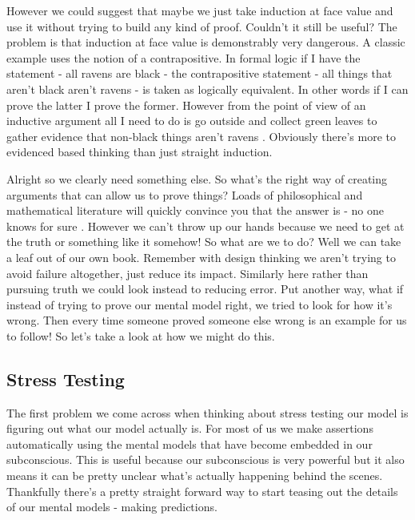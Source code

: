 \documentclass[11pt,a5paper]{book}
\begin{document}
However we could suggest that maybe we just take induction at face value and use it without trying to build any kind of proof. Couldn't it still be useful? The problem is that induction at face value is demonstrably very dangerous. A classic example uses the notion of a contrapositive. In formal logic if I have the statement - all ravens are black - the contrapositive statement - all things that aren't black aren't ravens - is taken as logically equivalent. In other words if I can prove the latter I prove the former. However from the point of view of an inductive argument all I need to do is go outside and collect green leaves to gather evidence that non-black things aren't ravens \cite{lipton}. Obviously there's more to evidenced based thinking than just straight induction.
\newline

Alright so we clearly need something else. So what's the right way of creating arguments that can allow us to prove things? Loads of philosophical and mathematical literature will quickly convince you that the answer is - no one knows for sure \cite{lipton} \cite{tkuhn}. However we can't throw up our hands because we need to get at the truth or something like it somehow! So what are we to do? Well we can take a leaf out of our own book. Remember with design thinking we aren't trying to avoid failure altogether, just reduce its impact. Similarly here rather than pursuing truth we could look instead to reducing error. Put another way, what if instead of trying to prove our mental model right, we tried to look for how it's wrong. Then every time someone proved someone else wrong is an example for us to follow! So let's take a look at how we might do this. 

\subsection{Stress Testing}
The first problem we come across when thinking about stress testing our model is figuring out what our model actually is. For most of us we make assertions automatically using the mental models that have become embedded in our subconscious. This is useful because our subconscious is very powerful \cite{newport} but it also means it can be pretty unclear what's actually happening behind the scenes. Thankfully there's a pretty straight forward way to start teasing out the details of our mental models - making predictions. 
\newline
\end{document}
